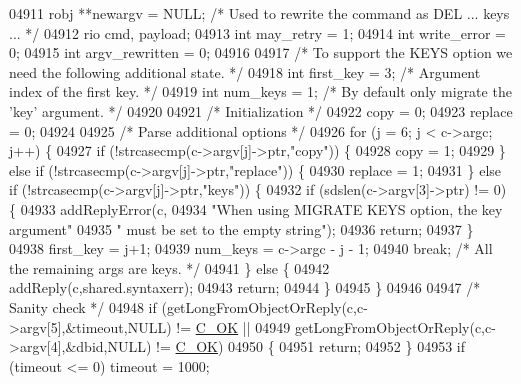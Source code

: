 \begin{DoxyCode}
{{{{{{{{{{{{{{{{{{{{{{{{{{{{{{{{{{{{{{{{{{{{{{{{{{{{{{{{{{{{{{{{{{{{{{{{{{{{{{{{{{{{{{{{{{{{{{{{{{{{{{{{{{{04911     robj **newargv = NULL; \textcolor{comment}{/* Used to rewrite the command as DEL ... keys ... */}
04912     rio cmd, payload;
04913     \textcolor{keywordtype}{int} may\_retry = 1;
04914     \textcolor{keywordtype}{int} write\_error = 0;
04915     \textcolor{keywordtype}{int} argv\_rewritten = 0;
04916 
04917     \textcolor{comment}{/* To support the KEYS option we need the following additional state. */}
04918     \textcolor{keywordtype}{int} first\_key = 3; \textcolor{comment}{/* Argument index of the first key. */}
04919     \textcolor{keywordtype}{int} num\_keys = 1;  \textcolor{comment}{/* By default only migrate the 'key' argument. */}
04920 
04921     \textcolor{comment}{/* Initialization */}
04922     copy = 0;
04923     replace = 0;
04924 
04925     \textcolor{comment}{/* Parse additional options */}
04926     \textcolor{keywordflow}{for} (j = 6; j < c->argc; j++) \{
04927         \textcolor{keywordflow}{if} (!strcasecmp(c->argv[j]->ptr,\textcolor{stringliteral}{"copy"})) \{
04928             copy = 1;
04929         \} \textcolor{keywordflow}{else} \textcolor{keywordflow}{if} (!strcasecmp(c->argv[j]->ptr,\textcolor{stringliteral}{"replace"})) \{
04930             replace = 1;
04931         \} \textcolor{keywordflow}{else} \textcolor{keywordflow}{if} (!strcasecmp(c->argv[j]->ptr,\textcolor{stringliteral}{"keys"})) \{
04932             \textcolor{keywordflow}{if} (sdslen(c->argv[3]->ptr) != 0) \{
04933                 addReplyError(c,
04934                     \textcolor{stringliteral}{"When using MIGRATE KEYS option, the key argument"}
04935                     \textcolor{stringliteral}{" must be set to the empty string"});
04936                 \textcolor{keywordflow}{return};
04937             \}
04938             first\_key = j+1;
04939             num\_keys = c->argc - j - 1;
04940             \textcolor{keywordflow}{break}; \textcolor{comment}{/* All the remaining args are keys. */}
04941         \} \textcolor{keywordflow}{else} \{
04942             addReply(c,shared.syntaxerr);
04943             \textcolor{keywordflow}{return};
04944         \}
04945     \}
04946 
04947     \textcolor{comment}{/* Sanity check */}
04948     \textcolor{keywordflow}{if} (getLongFromObjectOrReply(c,c->argv[5],&timeout,NULL) != \hyperlink{server_8h_a303769ef1065076e68731584e758d3e1}{C\_OK} ||
04949         getLongFromObjectOrReply(c,c->argv[4],&dbid,NULL) != \hyperlink{server_8h_a303769ef1065076e68731584e758d3e1}{C\_OK})
04950     \{
04951         \textcolor{keywordflow}{return};
04952     \}
04953     \textcolor{keywordflow}{if} (timeout <= 0) timeout = 1000;
}}}}}}}}}}}}}}}}}}}}}}}}}}}}}}}}}}}}}}}}}}}}}}}}}}}}}}}}}}}}}}}}}}}}}}}}}}}}}}}}}}}}}}}}}}}}}}}}}}}}}}}}}}}
\end{DoxyCode}
